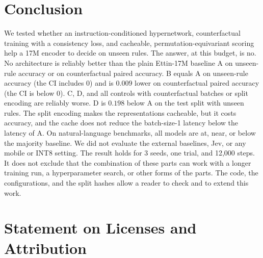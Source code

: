 \documentclass[11pt,a4paper]{article}
\begin{document}
\section{Conclusion}\label{sec:conclusion}

We tested whether an instruction-conditioned hypernetwork, counterfactual training with a consistency loss, and cacheable, permutation-equivariant scoring help a 17M encoder to decide on unseen rules.
The answer, at this budget, is no.
No architecture is reliably better than the plain Ettin-17M baseline A on unseen-rule accuracy or on counterfactual paired accuracy.
B equals A on unseen-rule accuracy (the CI includes 0) and is $0.009$ lower on counterfactual paired accuracy (the CI is below 0).
C, D, and all controls with counterfactual batches or split encoding are reliably worse.
D is $0.198$ below A on the test split with unseen rules.
The split encoding makes the representations cacheable, but it costs accuracy, and the cache does not reduce the batch-size-1 latency below the latency of A.
On natural-language benchmarks, all models are at, near, or below the majority baseline.
We did not evaluate the external baselines, Jev, or any mobile or INT8 setting.
The result holds for 3 seeds, one trial, and 12{,}000 steps.
It does not exclude that the combination of these parts can work with a longer training run, a hyperparameter search, or other forms of the parts.
The code, the configurations, and the split hashes allow a reader to check and to extend this work.

\section{Statement on Licenses and Attribution}\label{sec:license}
\end{document}
